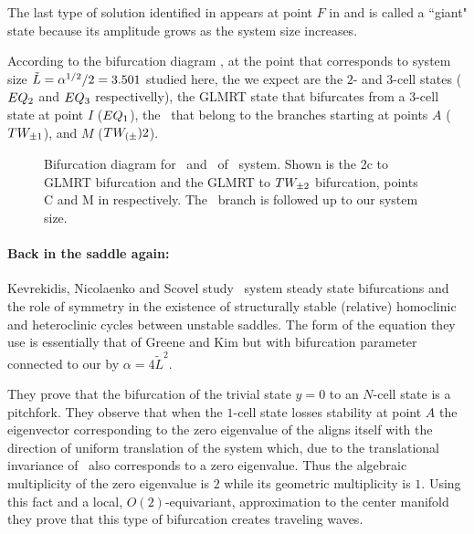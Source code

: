 The last type of solution identified in  appears at point $F$
in  and is called a
``giant" state because its amplitude grows as the system size increases.

According to the bifurcation diagram ,
at the point that corresponds to system size $\tilde{L}=\alpha^{1/2}/2=3.501$
studied here,
the {\eqva} we expect are the $2$- and $3$-cell states ($EQ_{2}$ and $EQ_{3}$ respectivelly), the GLMRT state that bifurcates from a $3$-cell state at point $I$ ($EQ_{1}$),
the \reqva\ that belong to the branches starting at points $A$ ($TW_{\pm1}$),
and $M$ ($TW_{(\pm}){2}$).

\begin{figure}
\begin{center}
\end{center}
\caption[Bifurcation diagram for equilibria of Kuramoto-Sivashinsky eq.]
    {
    Bifurcation diagram for \eqva\ and \reqva\ of \KS\ system.
    Shown is the 2c to GLMRT bifurcation and the GLMRT to $TW_{\pm2}$ bifurcation,
    points C and M in  respectively. The \reqv\ branch
    is followed up to our system size.
        }
\end{figure}

\paragraph{Back in the saddle again:}
%
Kevrekidis, Nicolaenko and Scovel study \KS\ system
steady state bifurcations and the role of symmetry in the
existence of structurally stable (relative) homoclinic and
heteroclinic cycles between unstable saddles. The form  of
the equation they use is essentially that of Greene and Kim but
with bifurcation parameter connected to our by
$\alpha=4\tilde{L}^2$.


They prove that the bifurcation of the trivial state $y=0$ to
an $N$-cell state is a pitchfork. They observe that when the
$1$-cell state losses stability at point $A$ the eigenvector
corresponding to the zero eigenvalue of the {\stabmat}
aligns itself with the direction of uniform translation of the
system which, due to the translational invariance of \KSe\,
also corresponds to a zero eigenvalue. Thus the algebraic
multiplicity of the zero eigenvalue is $2$ while its geometric
multiplicity is $1$. Using this fact and a local,
$O(2)$-equivariant, approximation to the center manifold they
prove that this type of bifurcation creates traveling waves.

